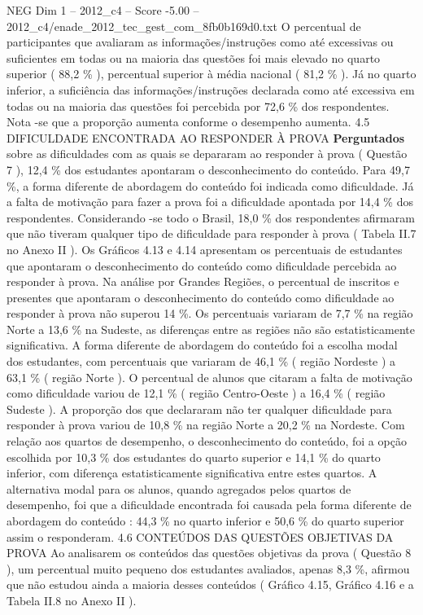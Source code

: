 \begin{textsample}{NEG Dim 1 – 2012\_c4 – Score -5.00 – 2012\_c4/enade\_2012\_tec\_gest\_com\_8fb0b169d0.txt}
O percentual de participantes que avaliaram as informações/instruções como até excessivas ou suficientes em todas ou na maioria das questões foi mais elevado no quarto superior ( 88,2 \% ), percentual superior à média nacional ( 81,2 \% ).
Já no quarto inferior, a suficiência das informações/instruções declarada como até excessiva em todas ou na maioria das questões foi percebida por 72,6 \% dos respondentes.
Nota -se que a proporção aumenta conforme o desempenho aumenta. 4.5 DIFICULDADE ENCONTRADA AO RESPONDER À PROVA \textbf{Perguntados} sobre as dificuldades com as quais se depararam ao responder à prova ( Questão 7 ), 12,4 \% dos estudantes apontaram o desconhecimento do conteúdo.
Para 49,7 \%, a forma diferente de abordagem do conteúdo foi indicada como dificuldade.
Já a falta de motivação para fazer a prova foi a dificuldade apontada por 14,4 \% dos respondentes.
Considerando -se todo o Brasil, 18,0 \% dos respondentes afirmaram que não tiveram qualquer tipo de dificuldade para responder à prova ( Tabela II.7 no Anexo II ).
Os Gráficos 4.13 e 4.14 apresentam os percentuais de estudantes que apontaram o desconhecimento do conteúdo como dificuldade percebida ao responder à prova.
Na análise por Grandes Regiões, o percentual de inscritos e presentes que apontaram o desconhecimento do conteúdo como dificuldade ao responder à prova não superou 14 \%.
Os percentuais variaram de 7,7 \% na região Norte a 13,6 \% na Sudeste, as diferenças entre as regiões não são estatisticamente significativa.
A forma diferente de abordagem do conteúdo foi a escolha modal dos estudantes, com percentuais que variaram de 46,1 \% ( região Nordeste ) a 63,1 \% ( região Norte ).
O percentual de alunos que citaram a falta de motivação como dificuldade variou de 12,1 \% ( região Centro-Oeste ) a 16,4 \% ( região Sudeste ).
A proporção dos que declararam não ter qualquer dificuldade para responder à prova variou de 10,8 \% na região Norte a 20,2 \% na Nordeste.
Com relação aos quartos de desempenho, o desconhecimento do conteúdo, foi a opção escolhida por 10,3 \% dos estudantes do quarto superior e 14,1 \% do quarto inferior, com diferença estatisticamente significativa entre estes quartos.
A alternativa modal para os alunos, quando agregados pelos quartos de desempenho, foi que a dificuldade encontrada foi causada pela forma diferente de abordagem do conteúdo : 44,3 \% no quarto inferior e 50,6 \% do quarto superior assim o responderam. 4.6 CONTEÚDOS DAS QUESTÕES OBJETIVAS DA PROVA Ao analisarem os conteúdos das questões objetivas da prova ( Questão 8 ), um percentual muito pequeno dos estudantes avaliados, apenas 8,3 \%, afirmou que não estudou ainda a maioria desses conteúdos ( Gráfico 4.15, Gráfico 4.16 e a Tabela II.8 no Anexo II ).

\end{textsample}
